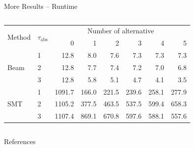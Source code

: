 \documentclass[en, navbaroff, handout]{sdqbeamer}
\begin{document}
\begin{frame}[t]{More Results -- Runtime}
\begin{columns}[T]
\begin{column}{\kitthreecolumns}
\begin{table}[t]
{					%
				}
				\begin{tabular}{llrrrrrr}
					\toprule
					\multirow{2}{*}{Method} & \multirow{2}{*}{$\tau_{\text{abs}}$} & \multicolumn{6}{c}{Number of alternative} \\
					\cmidrule(lr){3-8}
					& & 0 & 1 & 2 & 3 & 4 & 5 \\
					\midrule
					\multirow[t]{3}{*}{Beam} & 1 & 12.8 & 8.0 & 7.6 & 7.3 & 7.3 & 7.3 \\
					& 2 & 12.8 & 7.7 & 7.4 & 7.2 & 7.0 & 6.8 \\
					& 3 & 12.8 & 5.8 & 5.1 & 4.7 & 4.1 & 3.5 \\
					\multirow[t]{3}{*}{SMT} & 1 & 1091.7 & 166.0 & 221.5 & 239.6 & 258.1 & 277.9 \\
					& 2 & 1105.2 & 377.5 & 463.5 & 537.5 & 599.4 & 658.3 \\
					& 3 & 1107.4 & 869.1 & 670.8 & 597.6 & 588.1 & 557.6 \\
					\bottomrule
				\end{tabular}
				\label{tab:csd:alteratives-runtime}
			\end{table}
		\end{column}
	\end{columns}
\end{frame}

\begin{frame}[t, allowframebreaks]{References}
	\printbibliography
\end{frame}

\backupend
\end{document}
